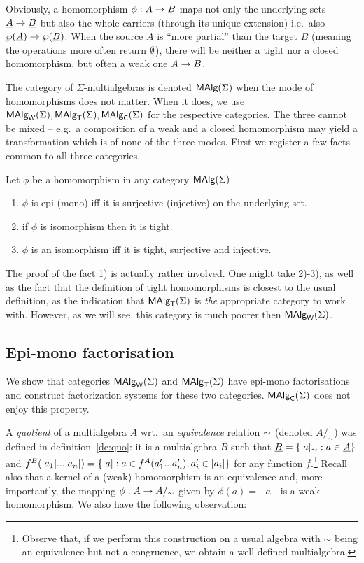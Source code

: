 \documentclass[10pt]{article}
\begin{document}
\noindent
Obviously, a homomorphism $\phi:A\rightarrow B$ maps not only the underlying
sets $\underline {A}\rightarrow \underline {B}$ but also the whole carriers (through its
unique extension) i.e.\ also $\wp(\underline {A})\rightarrow\wp(\underline {B})$.  When the source
$A$ is ``more partial'' than the target $B$ (meaning the operations
more often return $\emptyset$), there will be neither a tight nor a closed
homomorphism, but often a weak one $A\rightarrow B$.

The category of $\Sigma$-multialgebras is denoted $\mbox{\rm\sf MAlg}(\Sigma)$ when the mode
of homomorphisms does not matter. When it does, we use $\mbox{\rm\sf MAlg}_{\sf W}(\Sigma), \mbox{\rm\sf MAlg}_{\sf T}(\Sigma),
\mbox{\rm\sf MAlg}_{\sf C}(\Sigma)$ for the respective categories. The three cannot be mixed 
-- e.g.\ a composition of a weak and a closed
homomorphism may yield a transformation which is of none of the three
modes.
First we register a few facts common to all three categories.
%
\begin{Prop}
\label{fa:epimono}\label{le:isotight}
Let $\phi$ be a homomorphism in any category $\mbox{\rm\sf MAlg}(\Sigma)$
\begin{enumerate}\MyLPar
\item $\phi$ is epi (mono) iff it
is surjective (injective) on the underlying set. 
\item if $\phi$ is isomorphism then it is tight.
\item $\phi$ is an isomorphism iff it is tight,
surjective and injective.
\end{enumerate}
\end{Prop}

\noindent
The proof of the fact 1) is actually rather involved.
One might take 2)-3), as well as the fact that
the definition of tight homomorphisms is closest to the usual definition, as the
indication that $\mbox{\rm\sf MAlg}_{\sf T}(\Sigma)$ is {\em the} appropriate category to work with. 
However, as we will see, this category is much poorer then $\mbox{\rm\sf MAlg}_{\sf W}(\Sigma)$.

\subsection{Epi-mono factorisation}

We show that categories $\mbox{\rm\sf MAlg}_{\sf W}(\Sigma)$ and $\mbox{\rm\sf MAlg}_{\sf T}(\Sigma)$ have
epi-mono factorisations and construct factorization systems for
these two categories. $\mbox{\rm\sf MAlg}_{\sf C}(\Sigma)$ does not enjoy
this property.

A {\em quotient\/} of a multialgebra $A$ wrt.\ an {\em equivalence} relation
$\sim$ (denoted $A/_\sim$) was defined in definition~\ref{de:quo}: it is 
a multialgebra $B$ such that $\underline {B}
= \{ [a]_\sim : a \in \underline {A} \}$ and $f^B([a_{1}]...[a_{n}]) = \{ [a] : a
\in f^A(a'_{1}...a'_{n}), a'_i\in [a_i]\}$ for any function
$f$.\footnote{Observe that, if we perform this construction on a
 usual algebra with $\sim$
being an equivalence but not a congruence, we obtain a well-defined multialgebra.}
Recall also that a kernel of a (weak) homomorphism is an
equivalence and, more importantly, the mapping $\phi: A \rightarrow
A/_\sim$ given by $\phi(a) = [a]$ is a weak homomorphism. We also
have the following observation:
\end{document}
